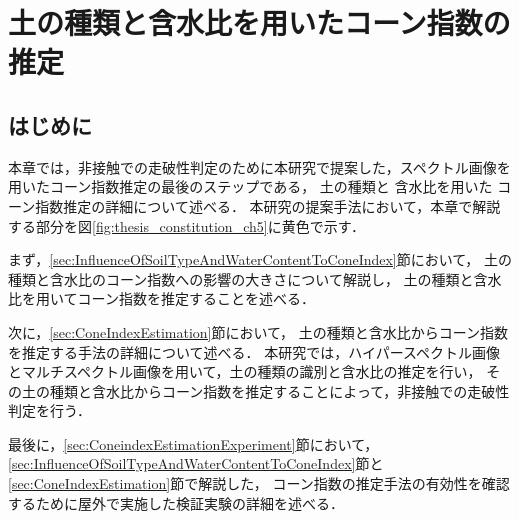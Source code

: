 \chapter{土の種類と含水比を用いたコーン指数の推定}
\thispagestyle{empty}
\label{ch:ConeIndexEstimation}
\minitoc

\newpage
\section{はじめに}
本章では，非接触での走破性判定のために本研究で提案した，スペクトル画像を用いたコーン指数推定の最後のステップである，
土の種類と
含水比を用いた
コーン指数推定の詳細について述べる．
本研究の提案手法において，本章で解説する部分を図\ref{fig:thesis_constitution_ch5}に黄色で示す．


まず，\ref{sec:InfluenceOfSoilTypeAndWaterContentToConeIndex}節において，
土の種類と含水比のコーン指数への影響の大きさについて解説し，
土の種類と含水比を用いてコーン指数を推定することを述べる．

次に，\ref{sec:ConeIndexEstimation}節において，
土の種類と含水比からコーン指数を推定する手法の詳細について述べる．
本研究では，ハイパースペクトル画像とマルチスペクトル画像を用いて，土の種類の識別と含水比の推定を行い，
その土の種類と含水比からコーン指数を推定することによって，非接触での走破性判定を行う．

最後に，\ref{sec:ConeindexEstimationExperiment}節において，
\ref{sec:InfluenceOfSoilTypeAndWaterContentToConeIndex}節と\ref{sec:ConeIndexEstimation}節で解説した，
コーン指数の推定手法の有効性を確認するために屋外で実施した検証実験の詳細を述べる．

